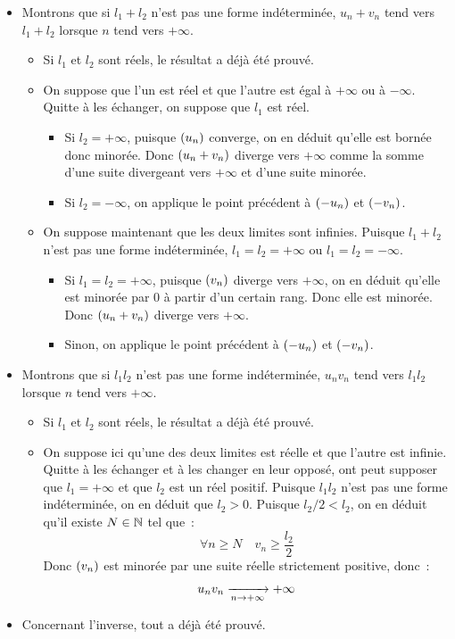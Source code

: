 \documentclass{magnoliaold}
\begin{document}
\begin{preuve}
\begin{itemize}
\item Montrons que si $l_1+l_2$ n'est pas une forme indéterminée, $u_n+v_n$
  tend vers $l_1+l_2$ lorsque $n$ tend vers $+\infty$.
  \begin{itemize}
  \item Si $l_1$ et $l_2$ sont réels, le résultat a déjà été prouvé.
  \item On suppose que l'un est réel et que l'autre est égal à $+\infty$ ou
    à $-\infty$. Quitte à les échanger, on suppose que $l_1$ est réel.
    \begin{itemize}
    \item Si $l_2=+\infty$, puisque $\left(u_n\right)$ converge, on en déduit qu'elle
      est bornée donc minorée. Donc $\left(u_n+v_n\right)$ diverge vers $+\infty$
      comme la somme d'une suite divergeant vers $+\infty$ et d'une suite
      minorée.
    \item Si $l_2=-\infty$, on applique le point précédent à $\left(-u_n\right)$ et
      $\left(-v_n\right)$.
    \end{itemize}
  \item On suppose maintenant que les deux limites sont infinies. Puisque
    $l_1+l_2$ n'est pas une forme indéterminée, $l_1=l_2=+\infty$ ou
    $l_1=l_2=-\infty$.
    \begin{itemize}
    \item Si $l_1=l_2=+\infty$, puisque $\left(v_n\right)$ diverge vers $+\infty$, on en
      déduit qu'elle est minorée par 0 à partir d'un certain rang. Donc
      elle est minorée. Donc $\left(u_n+v_n\right)$ diverge vers $+\infty$.
    \item Sinon, on applique le point précédent à $\left(-u_n\right)$ et $\left(-v_n\right)$.
    \end{itemize}
  \end{itemize}
\item Montrons que si $l_1 l_2$ n'est pas une forme indéterminée, $u_n v_n$
  tend vers $l_1 l_2$ lorsque $n$ tend vers $+\infty$.
  \begin{itemize}
  \item Si $l_1$ et $l_2$ sont réels, le résultat a déjà été prouvé.
  \item On suppose ici qu'une des deux limites est réelle et que l'autre
    est infinie. Quitte à les échanger et à les changer en leur opposé, ont
    peut supposer que $l_1=+\infty$ et que $l_2$ est un réel positif.
    Puisque $l_1 l_2$ n'est pas une forme indéterminée, on en déduit que
    $l_2>0$. Puisque $l_2/2<l_2$, on en déduit qu'il existe $N\in\mathbb{N}$ tel
    que~:
    \[\forall n\geq N \quad v_n \geq \frac{l_2}{2}\]
    Donc $\left(v_n\right)$ est minorée par une suite réelle strictement positive,
    donc~: \[{u_n v_n \xrightarrow[n\rightarrow +\infty]{} +\infty}\]
  \end{itemize}
\item Concernant l'inverse, tout a déjà été prouvé.
\end{itemize}
\end{preuve}
\end{document}
